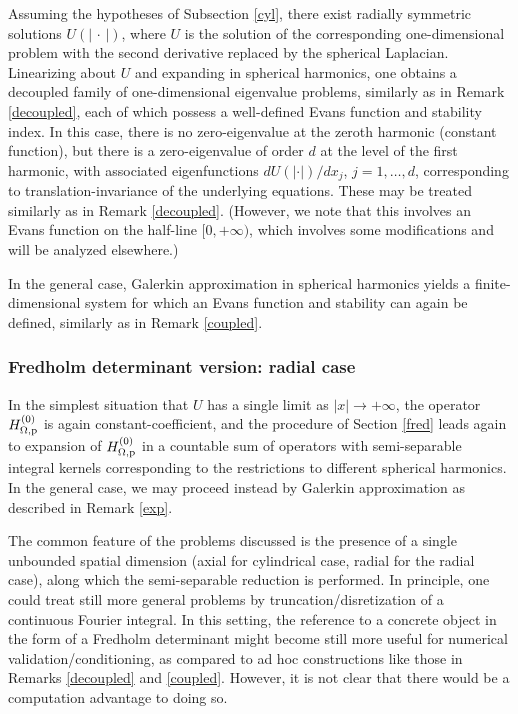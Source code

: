 \begin{remark}\label{rdecoupled}
Assuming the hypotheses of Subsection \ref{cyl}, there exist radially
symmetric solutions $U(|{\,\cdot\,}|)$, where $U$ is the
solution of the corresponding one-dimensional problem with the second
derivative replaced by the spherical Laplacian.
Linearizing about $U$ and expanding in spherical harmonics,
one obtains a decoupled family of one-dimensional eigenvalue problems,
similarly as in Remark \ref{decoupled},
each of which possess a well-defined Evans function and stability
index. In this case, there is no zero-eigenvalue at the zeroth harmonic
(constant function), but there is a zero-eigenvalue of order $d$ at the
level of the first harmonic, with associated eigenfunctions
$d U(|\cdot|)/dx_j$, $j=1, \dots, d$, corresponding to
translation-invariance of the underlying equations.
These may be treated similarly as in Remark \ref{decoupled}.
(However, we note that this involves an Evans function on the half-line
$[0,+\infty)$, which involves some modifications and will be analyzed elsewhere.)
\end{remark}

\begin{remark}\label{rcoupled}
In the general case, Galerkin approximation in spherical harmonics
yields a finite-dimensional system for which an Evans function and
stability can again be defined, similarly as in Remark \ref{coupled}.
\end{remark}

\subsubsection{Fredholm determinant version: radial case}\label{rfred}
In the simplest situation that $U$ has a single limit
as $|x|\to + \infty$, the operator $H^{(0)}_{\Omega, \rm p}$ is again constant-coefficient,
and the procedure of Section \ref{fred} leads again to expansion
of $H^{(0)}_{\Omega, \rm p}$ in a countable sum of operators with semi-separable integral kernels corresponding to the restrictions to different spherical harmonics.
In the general case, we may proceed instead by Galerkin approximation
as described in Remark \ref{exp}.

\begin{remark}\label{integral}
The common feature of the problems discussed is the presence of
a single unbounded spatial dimension (axial for cylindrical
case, radial for the radial case), along which the semi-separable
reduction is performed. In principle, one could treat still more general
problems by truncation/disretization of a continuous Fourier integral.
In this setting, the reference to a concrete object in the form
of a Fredholm determinant might become still more useful for numerical
validation/conditioning,
as compared to ad hoc constructions like those in
Remarks \ref{decoupled} and \ref{coupled}.
However, it is not clear that there would be a computation advantage
to doing so.
\end{remark}

